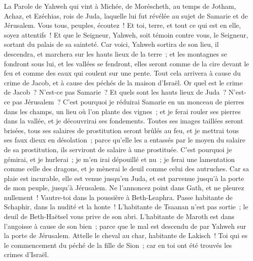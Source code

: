 \begin{multicols}{2}
\VerseOne{}La Parole de Yahweh qui vint à Michée, de Moréscheth, au temps de Jotham, Achaz, et Ezéchias, rois de Juda, laquelle  lui fut révélée au sujet de Samarie et de Jérusalem.
Vous tous, peuples, écoutez~! Et toi, terre, et tout ce qui est en elle, soyez attentifs~! Et que le Seigneur, Yahweh, soit témoin contre vous, le Seigneur, sortant du palais de sa sainteté.
Car voici, Yahweh sortira de son lieu, il descendra, et marchera sur les hauts lieux de la terre~;
et les montagnes se fondront sous lui, et les vallées se fendront, elles seront comme de la cire devant le feu et comme des eaux qui coulent sur une pente.
Tout cela arrivera à cause du crime de Jacob, et à cause des péchés de la maison d'Israël. Or quel est le crime de Jacob~? N'est-ce pas Samarie~? Et quels sont les hauts lieux de Juda~? N'est-ce pas Jérusalem~?
C'est pourquoi je réduirai Samarie en un monceau de pierres dans les champs, un lieu où l'on plante des vignes~; et je ferai rouler ses pierres dans la vallée, et je découvrirai ses fondements.
Toutes ses images taillées seront brisées, tous ses salaires de prostitution seront brûlés au feu, et je mettrai tous ses faux dieux en désolation~; parce qu'elle les a entassés par le moyen du salaire de sa prostitution, ils serviront de salaire à une prostituée.
C'est pourquoi je gémirai, et je hurlerai~; je m'en irai dépouillé et nu~; je ferai une lamentation comme celle des dragons, et je mènerai le deuil comme celui des autruches.
Car sa plaie est incurable, elle est venue jusqu'en Juda, et est parvenue jusqu'à la porte de mon peuple, jusqu'à Jérusalem.
Ne l'annoncez point dans Gath, et ne pleurez nullement~! Vautre-toi dans la poussière à Beth-Leaphra.
Passe habitante de Schaphir, dans la nudité et la honte~! L'habitante de Tsaanan n'est pas sortie~; le deuil de Beth-Haëtsel vous prive de son abri.
L'habitante de Maroth est dans l'angoisse à cause de son bien~; parce que le mal est descendu de par Yahweh sur la porte de Jérusalem.
Attelle le cheval au char, habitante de Lakisch~! Toi qui es le commencement du péché de la fille de Sion~; car en toi ont été trouvés les crimes d'Israël.

\end{multicols}
